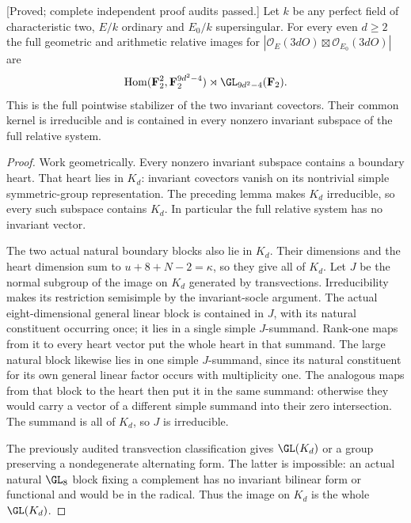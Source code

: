 \begin{theorem}
\label{thm:mixed-every-fixed-modulus-all-even-candidate}
\textup{[Proved; complete independent proof audits passed.]}
Let $k$ be any perfect field of characteristic two, $E/k$
ordinary and $E_0/k$ supersingular. For every even $d\geq2$
the full geometric and arithmetic relative images for
$|\mathcal O_E(3dO)\boxtimes\mathcal O_{E_0}(3dO)|$ are
\[
 \operatorname{Hom}(\mathbf F_2^2,\mathbf F_2^{9d^2-4})
                       \rtimes\GL_{9d^2-4}(\mathbf F_2).
\]
This is the full pointwise stabilizer of the two invariant
covectors. Their common kernel is irreducible and is contained
in every nonzero invariant subspace of the full relative system.
\end{theorem}
\begin{proof}
Work geometrically. Every nonzero invariant subspace contains
a boundary heart. That heart lies in $K_d$: invariant
covectors vanish on its nontrivial simple symmetric-group
representation. The preceding lemma makes $K_d$ irreducible,
so every such subspace contains $K_d$. In particular the
full relative system has no invariant vector.

The two actual natural boundary blocks also lie in $K_d$.
Their dimensions and the heart dimension sum to
$u+8+N-2=\kappa$, so they give all of $K_d$.
Let $J$ be the normal subgroup of the image on $K_d$
generated by transvections. Irreducibility makes its
restriction semisimple by the invariant-socle argument.
The actual eight-dimensional general linear block is
contained in $J$, with its natural constituent occurring
once; it lies in a single simple $J$-summand. Rank-one
maps from it to every heart vector put the whole heart
in that summand. The large natural block likewise lies
in one simple $J$-summand, since its natural constituent
for its own general linear factor occurs with multiplicity one.
The analogous maps from that block to the heart then put it in the
same summand: otherwise they would carry a vector of
a different simple summand into their zero intersection.
The summand is all of $K_d$, so $J$ is irreducible.

The previously audited transvection classification
\cite[Theorem~3.6, printed p.~22]{KantorSeress2001}
gives $\GL(K_d)$ or a group preserving a nondegenerate
alternating form. The latter is impossible: an actual
natural $\GL_8$ block fixing a complement has no invariant
bilinear form or functional and would be in the radical.
Thus the image on $K_d$ is the whole $\GL(K_d)$.


\end{proof}
